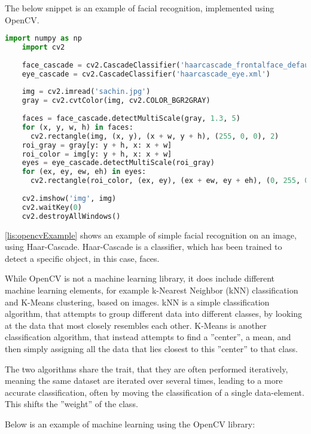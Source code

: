 The below snippet is an example of facial recognition, implemented using OpenCV.
\begin{lstlisting}[language=Python,label=lis:opencvExample,caption=Source code from the OpenCV documentation\cite{opencvHaarExample}.]
	import numpy as np
	import cv2
	
	face_cascade = cv2.CascadeClassifier('haarcascade_frontalface_default.xml')
	eye_cascade = cv2.CascadeClassifier('haarcascade_eye.xml')
	
	img = cv2.imread('sachin.jpg')
	gray = cv2.cvtColor(img, cv2.COLOR_BGR2GRAY)
	
	faces = face_cascade.detectMultiScale(gray, 1.3, 5)
	for (x, y, w, h) in faces:
	  cv2.rectangle(img, (x, y), (x + w, y + h), (255, 0, 0), 2)
	roi_gray = gray[y: y + h, x: x + w]
	roi_color = img[y: y + h, x: x + w]
	eyes = eye_cascade.detectMultiScale(roi_gray)
	for (ex, ey, ew, eh) in eyes:
	  cv2.rectangle(roi_color, (ex, ey), (ex + ew, ey + eh), (0, 255, 0), 2)
	
	cv2.imshow('img', img)
	cv2.waitKey(0)
	cv2.destroyAllWindows()
\end{lstlisting}
\autoref{lis:opencvExample} shows an example of simple facial recognition on an image, using Haar-Cascade.
Haar-Cascade is a classifier, which has been trained to detect a specific object, in this case, faces.

While OpenCV is not a machine learning library, it does include different machine learning elements, for example k-Nearest Neighbor (kNN) classification and K-Means clustering, based on images.
kNN is a simple classification algorithm, that attempts to group different data into different classes, by looking at the data that most closely resembles each other.
K-Means is another classification algorithm, that instead attempts to find a ''center'', a mean, and then simply assigning all the data that lies closest to this ''center'' to that class.

The two algorithms share the trait, that they are often performed iteratively, meaning the same dataset are iterated over several times, leading to a more accurate classification, often by moving the classification of a single data-element.
This shifts the ''weight'' of the class.

Below is an example of machine learning using the OpenCV library:

